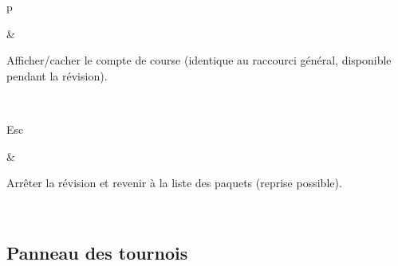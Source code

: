 \documentclass[letterpaper,10pt,french]{sphinxmanual}
\begin{document}
\begin{savenotes}
\begin{tabular}[t]{}
\begin{varwidth}[t]{}
\sphinxAtStartPar
p
\sphinxbeforeendvarwidth
\end{varwidth}%
&\begin{varwidth}[t]{}
\sphinxAtStartPar
Afficher/cacher le compte de course (identique au raccourci général, disponible pendant la révision).
\sphinxbeforeendvarwidth
\end{varwidth}%
\\
\sphinxhline\begin{varwidth}[t]{}
\sphinxAtStartPar
Esc
\sphinxbeforeendvarwidth
\end{varwidth}%
&\begin{varwidth}[t]{}
\sphinxAtStartPar
Arrêter la révision et revenir à la liste des paquets (reprise possible).
\sphinxbeforeendvarwidth
\end{varwidth}%
\\
\sphinxbottomrule
\end{tabular}
\sphinxtableafterendhook\par
\sphinxattableend\end{savenotes}


\subsection{Panneau des tournois}
\label{\detokenize{raccourcis:panneau-des-tournois}}\label{\detokenize{raccourcis:raccourcis-tournament-panel}}
\end{document}
